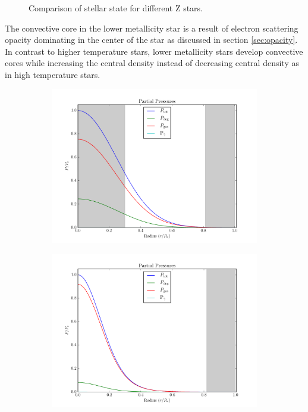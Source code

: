 \documentclass[11pt]{article}
\begin{document}
\begin{center}
\begin{figure}[H]
\begin{subfigure}{.5\textwidth}
                \label{fig:Zstarshigh}
            \end{subfigure}
            \caption{Comparison of stellar state for different Z stars.}
            \label{fig:stellarstatecomparisonZ}
        \end{figure}
    \end{center}
    The convective core in the lower metallicity star is a result of electron scattering opacity dominating in the center of the star as discussed in section \ref{sec:opacity}. In contrast to higher temperature stars, lower metallicity stars develop convective cores while increasing the central density instead of decreasing central density as in high temperature stars.
    \begin{center}
        \begin{figure}[H]
            \begin{subfigure}{.5\textwidth}
                \centering
                \includegraphics[width=1.1\textwidth]{figures/lowZ/partial_pressure.pdf}
            \end{subfigure}
            \begin{subfigure}{.5\textwidth}
                \centering
                \includegraphics[width=1.1\textwidth]{figures/highZ/partial_pressure.pdf}

\end{subfigure}
\end{figure}
\end{center}
\end{document}
